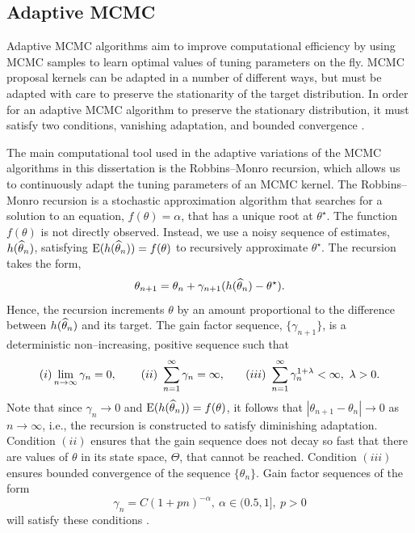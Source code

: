 \subsection{Adaptive MCMC}
\label{subsec:adaptive_mcmc}

Adaptive MCMC algorithms aim to improve computational efficiency by using MCMC samples to learn optimal values of tuning parameters on the fly. MCMC proposal kernels can be adapted in a number of different ways, but must be adapted with care to preserve the stationarity of the target distribution. In order for an adaptive MCMC algorithm to preserve the stationary distribution, it must satisfy two conditions, vanishing adaptation, and bounded convergence \cite{andrieu2008tutorial}.

The main computational tool used in the adaptive variations of the MCMC algorithms in this dissertation is the Robbins--Monro recursion, which allows us to continuously adapt the tuning parameters of an MCMC kernel. The Robbins--Monro recursion is a stochastic approximation algorithm that searches for a solution to an equation, $ f(\theta) = \alpha $, that has a unique root at $ \theta^\star $. The function $ f(\theta) $ is not directly observed. Instead, we use a noisy sequence of estimates, $ h(\widehat{\theta}_n) $, satisfying $ \mathrm{E}(h(\widehat{\theta}_n)) = f(\theta) $ to recursively approximate $ \theta^\star $. The recursion takes the form, $$\theta_{n+1} = \theta_n + \gamma_{n+1}(h(\widehat{\theta}_n) - \theta^\star).$$
Hence, the recursion increments $ \theta $ by an amount proportional to the difference between $ h(\widehat{\theta}_n) $ and its target.  The gain factor sequence, $ \lbrace\gamma_{n+1}\rbrace $, is a deterministic non--increasing, positive sequence such that $$(i) \lim\limits_{n\rightarrow\infty}\gamma_n = 0,\ \hspace{0.25in}(ii)\ \sum_{n=1}^\infty \gamma_n = \infty,\hspace{0.25in} (iii)\  \sum_{n=1}^\infty\gamma_n^{1+\lambda} < \infty,\ \lambda > 0.$$
Note that since $ \gamma_n\rightarrow0 $ and $ \mathrm{E}(h(\widehat{\theta}_n))= f(\theta) $, it follows that $ |\theta_{n+1} - \theta_n|\rightarrow0 $ as $ n\rightarrow\infty $, i.e., the recursion is constructed to satisfy diminishing adaptation. Condition $ (ii) $ ensures that the gain sequence does not decay so fast that there are values of $ \theta $ in its state space, $ \Theta $, that cannot be reached. Condition $ (iii) $ ensures bounded convergence of the sequence $ \lbrace\theta_n\rbrace $. Gain factor sequences of the form \begin{equation}
\label{eqn:gain_factor_seq}
 \gamma_n = C(1+pn)^{-\alpha},\ \alpha\in(0.5,1],\ p>0
\end{equation}  will satisfy these conditions \cite{andrieu2008tutorial,liang2011advanced}. 


